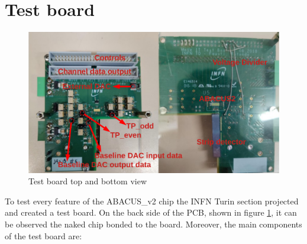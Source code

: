 \section{Test board}\label{testboard}
\begin{figure}[H]
	\centering
	\includegraphics[width=0.9\linewidth]{IMG/ch5/TESTBOARD}
	\caption{Test board top and bottom view}
	\label{fig:testboard}
\end{figure}
To test every feature of the ABACUS\_v2 chip the INFN Turin section projected and created a test board.
On the back side of the PCB, shown in figure \ref{fig:testboard}, it can be observed the naked chip bonded to the board.
Moreover, the main components of the test board are:
